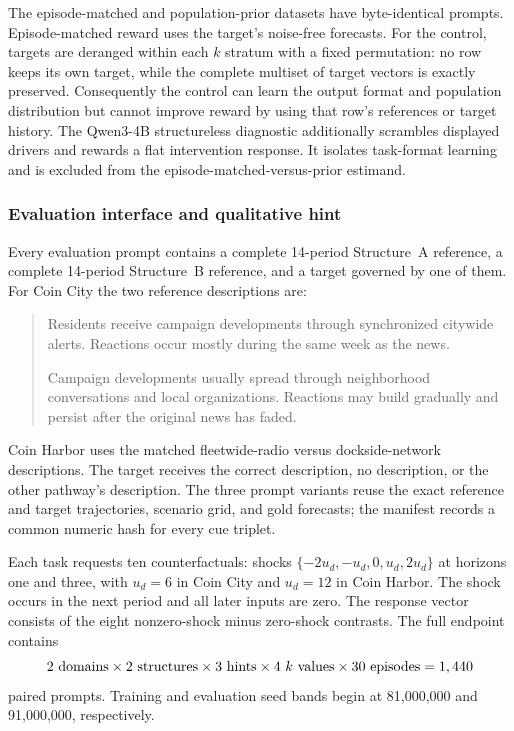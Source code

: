 The episode-matched and population-prior datasets have byte-identical prompts.
Episode-matched reward uses the target's noise-free forecasts. For the control, targets are
deranged within each $k$ stratum with a fixed permutation: no row keeps its own
target, while the complete multiset of target vectors is exactly preserved.
Consequently the control can learn the output format and population distribution
but cannot improve reward by using that row's references or target history.
The Qwen3-4B structureless diagnostic additionally scrambles displayed drivers
and rewards a flat intervention response. It isolates task-format learning and is
excluded from the episode-matched-versus-prior estimand.



\subsubsection{Evaluation interface and qualitative hint}

Every evaluation prompt contains a complete 14-period Structure~A reference, a
complete 14-period Structure~B reference, and a target governed by one of them.
For Coin City the two reference descriptions are:
\begin{quote}\small
Residents receive campaign developments through synchronized citywide alerts.
Reactions occur mostly during the same week as the news.

Campaign developments usually spread through neighborhood conversations and
local organizations. Reactions may build gradually and persist after the
original news has faded.
\end{quote}
Coin Harbor uses the matched fleetwide-radio versus dockside-network descriptions.
The target receives the correct description, no description, or the other
pathway's description. The three prompt variants reuse the exact reference and
target trajectories, scenario grid, and gold forecasts; the manifest records a
common numeric hash for every cue triplet.

Each task requests ten counterfactuals: shocks
$\{-2u_d,-u_d,0,u_d,2u_d\}$ at horizons one and three, with $u_d=6$ in Coin City
and $u_d=12$ in Coin Harbor. The shock occurs in the next period and all later
inputs are zero. The response vector consists of the eight nonzero-shock minus
zero-shock contrasts. The full endpoint contains
\[
2\ {\rm domains}\times2\ {\rm structures}\times3\ {\rm hints}\times
4\ k{\rm\ values}\times30\ {\rm episodes}=1,440
\]
paired prompts. Training and evaluation seed bands begin at 81,000,000 and
91,000,000, respectively.


